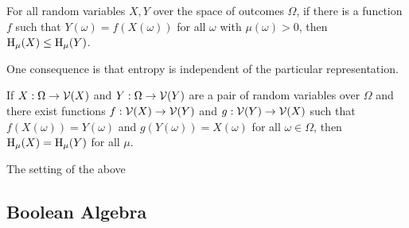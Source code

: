 \documentclass{article}
\begin{document}
    \begin{fact}
        For all random variables $X,Y$ over the space of outcomes $\Omega$, if there is a function $f$ such that $Y(\omega) = f(X(\omega))$ for all $\omega$ with $\mu(\omega) > 0$, then $\operatorname{\mathrm{H}}_\mu(X) \leq \operatorname{\mathrm{H}}_\mu(Y)$.
    \end{fact}
    One consequence is that entropy is independent of the particular representation.
    \begin{prop}
        If $X : \Omega \to \mathcal V(X)$ and $Y : \Omega \to \mathcal V(Y)$ are a pair of random variables over $\Omega$ and there exist functions $f : \mathcal V(X) \to \mathcal V(Y)$ and $g : \mathcal V(Y) \to \mathcal V(X)$ such that $f(X(\omega)) = Y(\omega)$ and $g(Y(\omega)) = X(\omega)$ for all $\omega \in \Omega$, then $\operatorname{\mathrm{H}}_\mu(X) = \operatorname{\mathrm{H}}_\mu(Y)$ for all $\mu$.
    \end{prop}

    The setting of the above
    \begin{center}
    \end{center}

    \subsection{Boolean Algebra}
\end{document}
